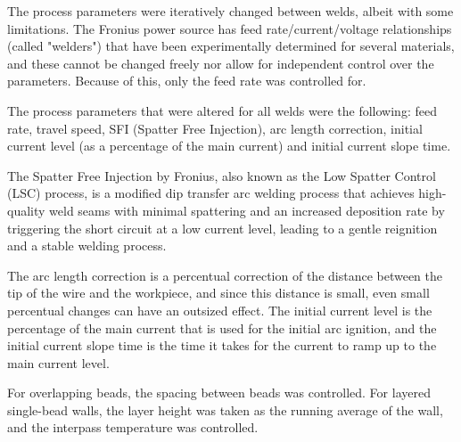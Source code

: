 The process parameters were iteratively changed between welds, albeit with some limitations. The Fronius power source has feed rate/current/voltage relationships (called "welders") that have been experimentally determined for several materials, and these cannot be changed freely nor allow for independent control over the parameters. Because of this, only the feed rate was controlled for.

The process parameters that were altered for all welds were the following: feed rate, travel speed, SFI (Spatter Free Injection), arc length correction, initial current level (as a percentage of the main current) and initial current slope time.

The Spatter Free Injection by Fronius, also known as the Low Spatter Control (LSC) process, is a modified dip transfer arc welding process that achieves high-quality weld seams with minimal spattering and an increased deposition rate by triggering the short circuit at a low current level, leading to a gentle reignition and a stable welding process.

The arc length correction is a percentual correction of the distance between the tip of the wire and the workpiece, and since this distance is small, even small percentual changes can have an outsized effect. The initial current level is the percentage of the main current that is used for the initial arc ignition, and the initial current slope time is the time it takes for the current to ramp up to the main current level.

For overlapping beads, the spacing between beads was controlled. For layered single-bead walls, the layer height was taken as the running average of the wall, and the interpass temperature was controlled.







